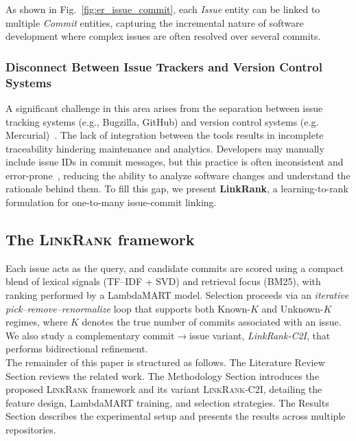 As shown in Fig.~\ref{fig:er_issue_commit}, each \textit{Issue} entity can be linked to multiple \textit{Commit} entities, capturing the incremental nature of software development where complex issues are often resolved over several commits.


\subsubsection*{Disconnect Between Issue Trackers and Version Control Systems}

A significant challenge in this area arises from the separation between issue tracking systems (e.g., Bugzilla, GitHub) and version control systems (e.g. Mercurial)~\cite{r1,r2}. The lack of integration between the tools results in incomplete traceability hindering maintenance and analytics. Developers may manually include issue IDs in commit messages, but this practice is often inconsistent and error-prone~\cite{r16,r18}, reducing the ability to analyze software changes and understand the rationale behind them. To fill this gap, we present \textbf{LinkRank}, a learning-to-rank formulation for one-to-many issue-commit linking.

\subsection{The \textsc{LinkRank} framework}

Each issue acts as the query, and candidate commits are scored using a compact blend of lexical signals (TF--IDF + SVD) and retrieval focus (BM25), with ranking performed by a LambdaMART model. Selection proceeds via an \emph{iterative pick--remove--renormalize} loop that supports both Known-$K$ and Unknown-$K$ regimes, where $K$ denotes the true number of commits associated with an issue. We also study a complementary commit$\rightarrow$issue variant, \textit{LinkRank-C2I}, that performs bidirectional refinement. \\

\noindent
The remainder of this paper is structured as follows. The Literature Review Section reviews the related work. The Methodology Section introduces the proposed \textsc{LinkRank} framework and its variant \textsc{LinkRank-C2I}, detailing the feature design, LambdaMART training, and selection strategies. The Results Section describes the experimental setup and presents the results across multiple repositories. 

% 
% 
